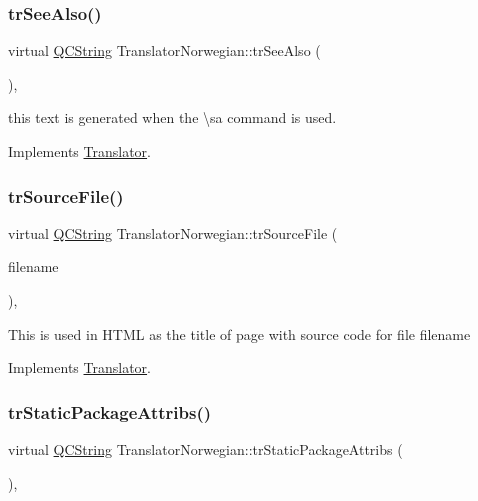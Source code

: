 \subsubsection{\texorpdfstring{trSeeAlso()}{trSeeAlso()}}
{\footnotesize\ttfamily virtual \mbox{\hyperlink{class_q_c_string}{Q\+C\+String}} Translator\+Norwegian\+::tr\+See\+Also (\begin{DoxyParamCaption}{ }\end{DoxyParamCaption})\hspace{0.3cm}{\ttfamily [inline]}, {\ttfamily [virtual]}}

this text is generated when the \textbackslash{}sa command is used. 

Implements \mbox{\hyperlink{class_translator}{Translator}}.

\mbox{\label{class_translator_norwegian_a44037b33f2a36b7216344c99a79d1f1e}} 
\subsubsection{\texorpdfstring{trSourceFile()}{trSourceFile()}}
{\footnotesize\ttfamily virtual \mbox{\hyperlink{class_q_c_string}{Q\+C\+String}} Translator\+Norwegian\+::tr\+Source\+File (\begin{DoxyParamCaption}\item[{\mbox{\hyperlink{class_q_c_string}{Q\+C\+String}} \&}]{filename }\end{DoxyParamCaption})\hspace{0.3cm}{\ttfamily [inline]}, {\ttfamily [virtual]}}

This is used in H\+T\+ML as the title of page with source code for file filename 

Implements \mbox{\hyperlink{class_translator}{Translator}}.

\mbox{\label{class_translator_norwegian_a0086614d2c15f91a0a0811c51f4b6ee6}} 
\subsubsection{\texorpdfstring{trStaticPackageAttribs()}{trStaticPackageAttribs()}}
{\footnotesize\ttfamily virtual \mbox{\hyperlink{class_q_c_string}{Q\+C\+String}} Translator\+Norwegian\+::tr\+Static\+Package\+Attribs (\begin{DoxyParamCaption}{ }\end{DoxyParamCaption})\hspace{0.3cm}{\ttfamily [inline]}, {\ttfamily [virtual]}}

